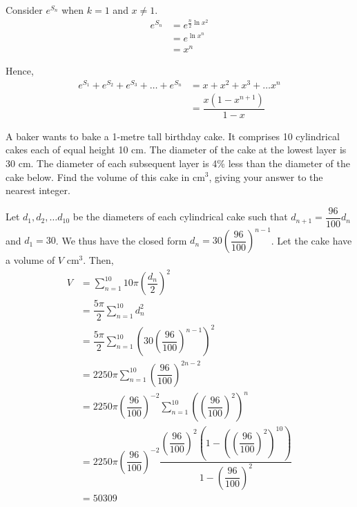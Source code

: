 \documentclass{echw}
\begin{document}
        Consider $e^{S_n}$ when $k = 1$ and $x \neq 1$.
        \begin{align*}
            e^{S_n} &= e^{\tfrac{n}2 \ln x^2}\\
            &= e^{\ln{x^n}}\\
            &= x^n
        \end{align*}

        Hence,
        \begin{align*}
            e^{S_1} + e^{S_2} + e^{S_3} + \ldots + e^{S_n} &= x + x^2 + x^3 + \ldots x^n\\
            &= \dfrac{x(1-x^{n+1})}{1-x}
        \end{align*}


    \problem{}
        A baker wants to bake a 1-metre tall birthday cake. It comprises 10 cylindrical cakes each of equal height 10 cm. The diameter of the cake at the lowest layer is 30 cm. The diameter of each subsequent layer is 4\% less than the diameter of the cake below. Find the volume of this cake in cm$^3$, giving your answer to the nearest integer.

    \solution
        Let $d_1, d_2, \ldots d_{10}$ be the diameters of each cylindrical cake such that $d_{n+1} = \dfrac{96}{100}d_n$ and $d_1 = 30$. We thus have the closed form $d_n = 30\left(\dfrac{96}{100}\right)^{n-1}$. Let the cake have a volume of $V$ cm$^3$. Then,
        \begin{align*}
            V &= \sum_{n=1}^{10} 10\pi \left(\dfrac{d_n}2\right)^2 \\
            &= \dfrac{5\pi}2 \sum_{n=1}^{10} d^2_n \\
            &= \dfrac{5\pi}2 \sum_{n=1}^{10} \left(30\left(\dfrac{96}{100}\right)^{n-1}\right)^2\\
            &= 2250\pi \sum_{n=1}^{10} \left(\dfrac{96}{100}\right)^{2n-2}\\
            &= 2250\pi \left(\dfrac{96}{100}\right)^{-2} \sum_{n=1}^{10} \left(\left(\dfrac{96}{100}\right)^2\right)^{n}\\
            &= 2250\pi \left(\dfrac{96}{100}\right)^{-2} \dfrac{\left(\dfrac{96}{100}\right)^2 \left(1 - \left(\left(\dfrac{96}{100}\right)^2\right)^{10}\right)}{1-\left(\dfrac{96}{100}\right)^2}\\
            &= 50309
        \end{align*}
\end{document}
